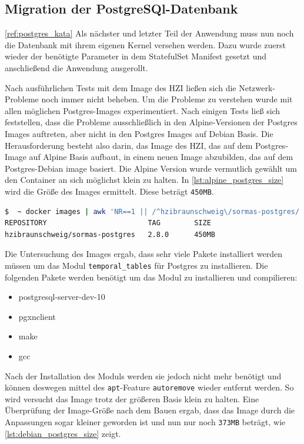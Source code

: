 \subsection{Migration der PostgreSQl-Datenbank}
\ref{ref:postgres_kata}
Als nächster und letzter Teil der Anwendung muss nun noch die Datenbank mit ihrem eigenen Kernel versehen werden.
Dazu wurde zuerst wieder der benötigte Parameter in dem StatefulSet Manifest gesetzt und anschließend die Anwendung ausgerollt.


Nach ausführlichen Tests mit dem Image des HZI ließen sich die Netzwerk-Probleme noch immer nicht beheben.
Um die Probleme zu verstehen wurde mit allen möglichen Postgres-Images experimentiert.
Nach einigen Tests ließ sich feststellen, dass die Probleme ausschließlich in den Alpine-Versionen der Postgres Images auftreten, aber nicht in den Postgres Images auf Debian Basis. 
Die Herausforderung besteht also darin, das Image des \ac{HZI}, das auf dem Postgres-Image auf Alpine Basis aufbaut, in einem neuen Image abzubilden, das auf dem Postgres-Debian image basiert.
Die Alpine Version wurde vermutlich gewählt um den Container an sich möglichst klein zu halten. 
In \ref{lst:alpine_postgres_size} wird die Größe des Images ermittelt.
Diese beträgt \texttt{450MB}.

\begin{lstlisting}[language=bash, caption={Größe des Postgres Images}, label=lst:alpine_postgres_size]
$  ~ docker images | awk 'NR==1 || /^hzibraunschweig\/sormas-postgres/ {printf "%-33s %-10s %s\n", $1, $2, $NF}'
REPOSITORY                        TAG        SIZE
hzibraunschweig/sormas-postgres   2.8.0      450MB
\end{lstlisting}

Die Untersuchung des Images ergab, dass sehr viele Pakete installiert werden müssen um das Modul \texttt{temporal\_tables} für Postgres zu installieren.
Die folgenden Pakete werden benötigt um das Modul zu installieren und compilieren:
\begin{itemize}
  \item postgresql-server-dev-10
  \item pgxnclient 
  \item make
  \item gcc
\end{itemize}

Nach der Installation des Moduls werden sie jedoch nicht mehr benötigt und können deswegen mittel des \texttt{apt}-Feature \texttt{autoremove} wieder entfernt werden. 
So wird versucht das Image trotz der größeren Basis klein zu halten.
Eine Überprüfung der Image-Größe nach dem Bauen ergab, dass das Image durch die Anpassungen sogar kleiner geworden ist und nun nur noch \texttt{373MB} beträgt, wie \ref{lst:debian_postgres_size} zeigt.

